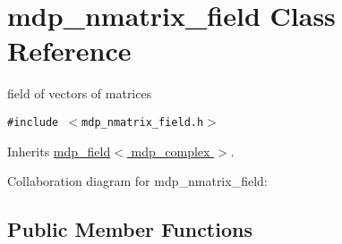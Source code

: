 \hypertarget{classmdp__nmatrix__field}{
\section{mdp\_\-nmatrix\_\-field Class Reference}
\label{classmdp__nmatrix__field}
}
field of vectors of matrices  


{\tt \#include $<$mdp\_\-nmatrix\_\-field.h$>$}

Inherits \hyperlink{classmdp__field}{mdp\_\-field$<$ mdp\_\-complex $>$}.

Collaboration diagram for mdp\_\-nmatrix\_\-field:\subsection*{Public Member Functions}
